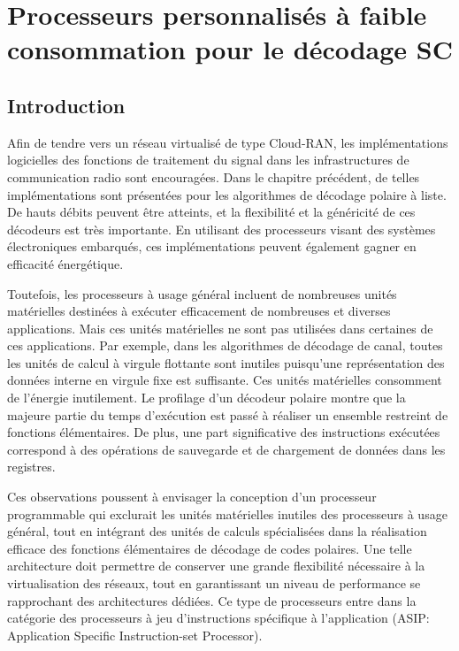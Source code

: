 \chapter{Processeurs personnalisés à faible consommation pour le décodage SC} %
\label{chap:tensilica}

\vspace*{\fill}
\minitocTITI
\vspace*{\fill}
\newpage

\section*{Introduction}
Afin de tendre vers un réseau virtualisé de type Cloud-RAN, les implémentations logicielles des fonctions de traitement du signal dans les infrastructures de communication radio sont encouragées. Dans le chapitre précédent, de telles implémentations sont présentées pour les algorithmes de décodage polaire à liste. De hauts débits peuvent être atteints, et la flexibilité et la généricité de ces décodeurs est très importante. En utilisant des processeurs visant des systèmes électroniques embarqués, ces implémentations peuvent également gagner en efficacité énergétique.

Toutefois, les processeurs à usage général incluent de nombreuses unités matérielles destinées à exécuter efficacement de nombreuses et diverses applications. Mais ces unités matérielles ne sont pas utilisées dans certaines de ces applications. Par exemple, dans les algorithmes de décodage de canal, toutes les unités de calcul à virgule flottante sont inutiles puisqu'une représentation des données interne en virgule fixe est suffisante. Ces unités matérielles consomment de l'énergie inutilement. Le profilage d'un décodeur polaire montre que la majeure partie du temps d'exécution est passé à réaliser un ensemble restreint de fonctions élémentaires. De plus, une part significative des instructions exécutées correspond à des opérations de sauvegarde et de chargement de données dans les registres.

Ces observations poussent à envisager la conception d'un processeur programmable qui exclurait les unités matérielles inutiles des processeurs à usage général, tout en intégrant des unités de calculs spécialisées dans la réalisation efficace des fonctions élémentaires de décodage de codes polaires. Une telle architecture doit permettre de conserver une grande flexibilité nécessaire à la virtualisation des réseaux, tout en garantissant un niveau de performance se rapprochant des architectures dédiées. Ce type de processeurs entre dans la catégorie des processeurs à jeu d'instructions spécifique à l'application (ASIP: Application Specific Instruction-set Processor).

